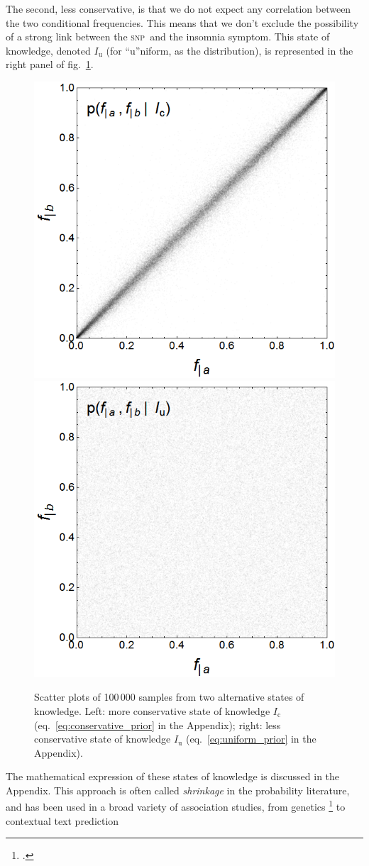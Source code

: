 \documentclass[\ifafour a4paper,12pt,\else a5paper,10pt,\fi%
onecolumn,oneside,article,%
british%
]{memoir}
\theoremstyle{remark}
\theoremstyle{innote}
\newcommand*{\citep}{\footcites}
\renewcommand*{\|}[1][]{\nonscript\,#1\vert\nonscript\;\mathopen{}}
\newcommand*{\eqn}{eq.}%
\newcommand*{\fig}{fig.}%
\newcommand*{\snp}{\textsc{snp}}
\newcommand*{\yI}{I}
\newcommand*{\yIu}{\yI_\text{u}}
\newcommand*{\yIc}{\yI_\text{c}}
\begin{document}
The second, less conservative, is that we do not expect any correlation
between the two conditional frequencies. This means that we don't exclude
the possibility of a strong link between the \snp\ and the insomnia
symptom. This state of knowledge, denoted $\yIu$ (for \enquote{u}niform, as
the distribution), is represented in the right panel of
\fig~\ref{fig:initial_beliefs}.
\begin{figure}[t!]%
 \centering\includegraphics[width=0.49\linewidth]{conserv_prior_list.png}%
 \includegraphics[width=0.49\linewidth]{unif_prior_list.png}
 \caption{Scatter plots of 100\,000 samples from two alternative states of
   knowledge. Left: more conservative state of knowledge $\yIc$
   (\eqn~\ref{eq:conservative_prior} in the Appendix); right: less
   conservative state of knowledge $\yIu$ (\eqn~\ref{eq:uniform_prior} in
   the Appendix).}\label{fig:initial_beliefs}
\end{figure}%

The mathematical expression of these states of knowledge is discussed in
the Appendix. This approach is often called \emph{shrinkage} in
the probability literature, and has been used in a broad variety of
association studies, from genetics \citep{lange1995,lockwoodetal2001} to
contextual text prediction
\end{document}
